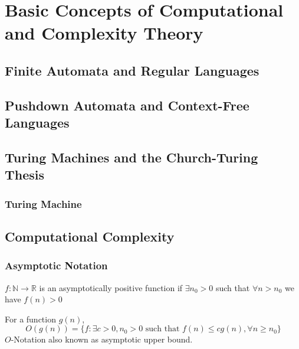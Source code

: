 		\chapter{Basic Concepts of Computational and Complexity Theory}
			\section{Finite Automata and Regular Languages}

			\section{Pushdown Automata and Context-Free Languages}

			\section{Turing Machines and the Church-Turing Thesis}
				\subsection{Turing Machine}

				\subsection{}

			\section{Computational Complexity}
				\subsection{Asymptotic Notation}
					\begin{definition}
						$f: \mathbb{N} \rightarrow \mathbb{R}$ is an asymptotically positive function if $\exists n_0 > 0$ such that $\forall n > n_0$ we have $f(n) > 0$
					\end{definition}

					\begin{definition}[$O$-Notation]
						For a function $g(n)$, 
						\begin{equation*}
							O(g(n)) = \{f: \exists c > 0, n_0 > 0 \text{ such that } f(n) \le cg(n), \forall n\ge n_0\}
						\end{equation*}
						$O$-Notation also known as asymptotic upper bound. 
					\end{definition}				

